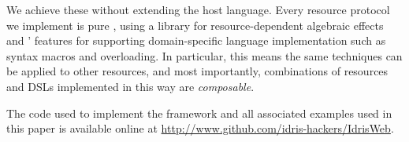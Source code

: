 We achieve these without extending the host language. Every
resource protocol we implement is pure \Idris{}, using a library for
resource-dependent algebraic effects~\cite{brady:effects} and \Idris{}'
features for supporting domain-specific language implementation such as
syntax macros and overloading. In particular, this means the same techniques
can be applied to other resources, and most importantly, combinations
of resources and DSLs implemented in this way are \emph{composable}.


The code used to implement the framework and all associated examples used in
this paper is available online at
\url{http://www.github.com/idris-hackers/IdrisWeb}.

